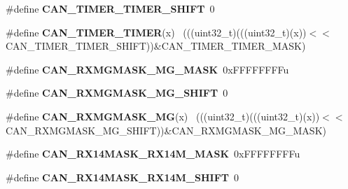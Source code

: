 \begin{DoxyCompactItemize}
\item 
\hypertarget{group___c_a_n___register___masks_gac979f0c3637eddae258cc50c0e9bb9cf}{}\#define {\bfseries C\+A\+N\+\_\+\+T\+I\+M\+E\+R\+\_\+\+T\+I\+M\+E\+R\+\_\+\+S\+H\+I\+F\+T}~0\label{group___c_a_n___register___masks_gac979f0c3637eddae258cc50c0e9bb9cf}

\item 
\hypertarget{group___c_a_n___register___masks_ga48012976326bd0be5c71b2ce472a19ae}{}\#define {\bfseries C\+A\+N\+\_\+\+T\+I\+M\+E\+R\+\_\+\+T\+I\+M\+E\+R}(x)                                          ~(((uint32\+\_\+t)(((uint32\+\_\+t)(x))$<$$<$C\+A\+N\+\_\+\+T\+I\+M\+E\+R\+\_\+\+T\+I\+M\+E\+R\+\_\+\+S\+H\+I\+F\+T))\&C\+A\+N\+\_\+\+T\+I\+M\+E\+R\+\_\+\+T\+I\+M\+E\+R\+\_\+\+M\+A\+S\+K)\label{group___c_a_n___register___masks_ga48012976326bd0be5c71b2ce472a19ae}

\item 
\hypertarget{group___c_a_n___register___masks_ga2d7a5f68a7047b3c535a554cc113ef4b}{}\#define {\bfseries C\+A\+N\+\_\+\+R\+X\+M\+G\+M\+A\+S\+K\+\_\+\+M\+G\+\_\+\+M\+A\+S\+K}~0x\+F\+F\+F\+F\+F\+F\+F\+Fu\label{group___c_a_n___register___masks_ga2d7a5f68a7047b3c535a554cc113ef4b}

\item 
\hypertarget{group___c_a_n___register___masks_ga1ace67c70d9f25a27ca39ce78cb0034d}{}\#define {\bfseries C\+A\+N\+\_\+\+R\+X\+M\+G\+M\+A\+S\+K\+\_\+\+M\+G\+\_\+\+S\+H\+I\+F\+T}~0\label{group___c_a_n___register___masks_ga1ace67c70d9f25a27ca39ce78cb0034d}

\item 
\hypertarget{group___c_a_n___register___masks_gafff55f047dbc3c1e1bccd43c79897c08}{}\#define {\bfseries C\+A\+N\+\_\+\+R\+X\+M\+G\+M\+A\+S\+K\+\_\+\+M\+G}(x)                                          ~(((uint32\+\_\+t)(((uint32\+\_\+t)(x))$<$$<$C\+A\+N\+\_\+\+R\+X\+M\+G\+M\+A\+S\+K\+\_\+\+M\+G\+\_\+\+S\+H\+I\+F\+T))\&C\+A\+N\+\_\+\+R\+X\+M\+G\+M\+A\+S\+K\+\_\+\+M\+G\+\_\+\+M\+A\+S\+K)\label{group___c_a_n___register___masks_gafff55f047dbc3c1e1bccd43c79897c08}

\item 
\hypertarget{group___c_a_n___register___masks_ga4687420a607d4279e24fa93f4b486ec3}{}\#define {\bfseries C\+A\+N\+\_\+\+R\+X14\+M\+A\+S\+K\+\_\+\+R\+X14\+M\+\_\+\+M\+A\+S\+K}~0x\+F\+F\+F\+F\+F\+F\+F\+Fu\label{group___c_a_n___register___masks_ga4687420a607d4279e24fa93f4b486ec3}

\item 
\hypertarget{group___c_a_n___register___masks_ga9e74b131e8180656fe9eb73191b73869}{}\#define {\bfseries C\+A\+N\+\_\+\+R\+X14\+M\+A\+S\+K\+\_\+\+R\+X14\+M\+\_\+\+S\+H\+I\+F\+T}~0\label{group___c_a_n___register___masks_ga9e74b131e8180656fe9eb73191b73869}


\end{DoxyCompactItemize}
